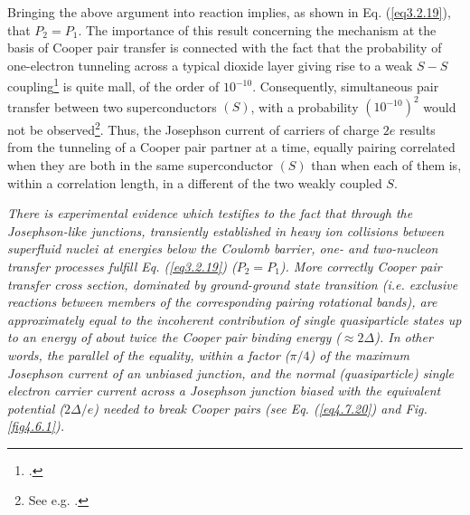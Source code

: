  
Bringing the above argument into reaction implies, as shown in Eq. (\ref{eq3.2.19}), that $P_2=P_1$.
 The importance of this result  concerning the mechanism at the basis of Cooper pair transfer is connected with the fact that the probability of one-electron tunneling across a typical dioxide layer giving rise to a weak $S-S$ coupling\footnote{\cite{Pippard:12}.} is quite mall, of the order of $10^{-10}$. Consequently, simultaneous pair transfer between two superconductors $(S)$, with a probability  $(10^{-10})^2$ would not be observed\footnote{See e.g. \cite{McDonald:01}.}. Thus, the Josephson current of carriers of charge $2e$ results from the tunneling of a Cooper pair partner at a time, equally pairing correlated when they are both in the same superconductor $(S)$ than when each of them is, within a correlation length,  in a different of the two weakly coupled $S$. 

\textit{There is experimental evidence which testifies to the fact that through the Josephson-like junctions, transiently established in heavy ion collisions between superfluid nuclei at energies below the Coulomb barrier, one- and two-nucleon transfer processes fulfill Eq. (\ref{eq3.2.19}) ($P_2=P_1$). More correctly Cooper pair transfer cross section, dominated by ground-ground state transition (i.e. exclusive reactions between members of the corresponding pairing rotational bands), are approximately equal to the incoherent contribution of single quasiparticle states up to an energy of about twice the Cooper pair binding energy ($\approx2\Delta$). In other words, the parallel of the equality, within a factor ($\pi/4$) of the maximum Josephson current of an unbiased junction, and the normal (quasiparticle) single electron carrier current across a Josephson junction biased with the equivalent potential ($2\Delta/e$) needed to  break Cooper pairs (see Eq. (\ref{eq4.7.20}) and Fig. \ref{fig4.6.1}).} 
